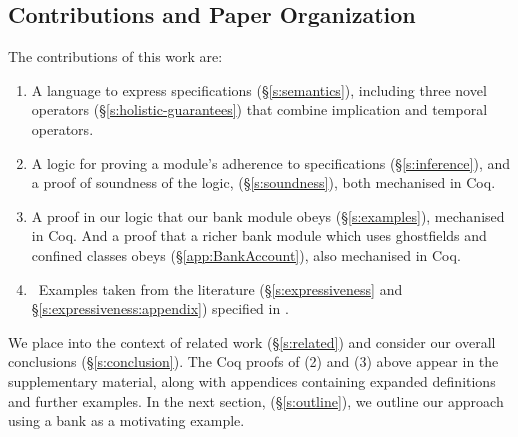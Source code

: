\subsection{Contributions and Paper Organization}


%
The contributions of this {work} are:
\begin{enumerate}
\item   A language to express \Nec specifications (\S\ref{s:semantics}), including three novel \Nec operators (\S\ref{s:holistic-guarantees}) that combine implication and temporal operators.  

 \item
A logic for proving a module's adherence to 
 \Nec specifications (\S\ref{s:inference}), and a proof of soundness of the logic, (\S\ref{s:soundness}),
both mechanised in Coq. 
 \item
A proof in our logic %
  that our bank module {obeys} %
  \SrobustB (\S\ref{s:examples}),     mechanised in Coq.
  And a proof that
  a richer bank module which uses ghostfields and confined classes  obeys  \SrobustB (\S\ref{app:BankAccount}),
  also mechanised in Coq.
\item \ {Examples taken from the literature  (\S\ref{s:expressiveness} and \S\ref{s:expressiveness:appendix}) specified in \Nec  .}

\end{enumerate}




 We place \Nec into the context of 
related work (\S\ref{s:related}) and consider our overall conclusions
(\S\ref{s:conclusion}). 
%
The Coq proofs of 
(2) and (3) above appear in the
supplementary material, along with {a}ppendices containing expanded 
definitions and further examples.
In the next section, (\S\ref{s:outline}),  we outline our approach using a
  bank   as  a motivating example.
